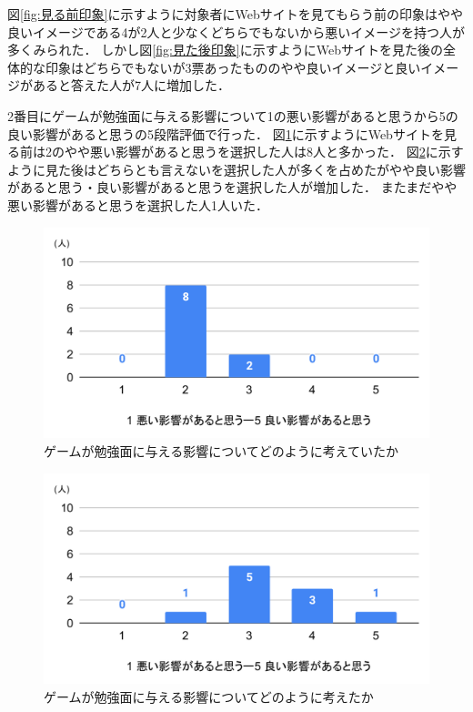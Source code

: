 \documentclass[12pt,a4j,titlepage]{ltjsarticle}
\begin{document}
図\ref{fig:見る前印象}に示すように対象者にWebサイトを見てもらう前の印象はやや良いイメージである4が2人と少なくどちらでもないから悪いイメージを持つ人が多くみられた．
しかし図\ref{fig:見た後印象}に示すようにWebサイトを見た後の全体的な印象はどちらでもないが3票あったもののやや良いイメージと良いイメージがあると答えた人が7人に増加した．

2番目にゲームが勉強面に与える影響について1の悪い影響があると思うから5の良い影響があると思うの5段階評価で行った．
図\ref{fig:勉強前}に示すようにWebサイトを見る前は2のやや悪い影響があると思うを選択した人は8人と多かった．
図\ref{fig:勉強後}に示すように見た後はどちらとも言えないを選択した人が多くを占めたがやや良い影響があると思う・良い影響があると思うを選択した人が増加した．
またまだやや悪い影響があると思うを選択した人1人いた．

\begin{figure}[H]
 \begin{center}
  \includegraphics[keepaspectratio, scale=0.6]{PDF/勉強前.pdf}
 \end{center}
 \caption{ゲームが勉強面に与える影響についてどのように考えていたか}
 \label{fig:勉強前}
\end{figure}

\begin{figure}[H]
 \begin{center}
  \includegraphics[keepaspectratio, scale=0.6]{PDF/勉強後.pdf}
 \end{center}
 \caption{ゲームが勉強面に与える影響についてどのように考えたか}
 \label{fig:勉強後}
\end{figure}
\end{document}
